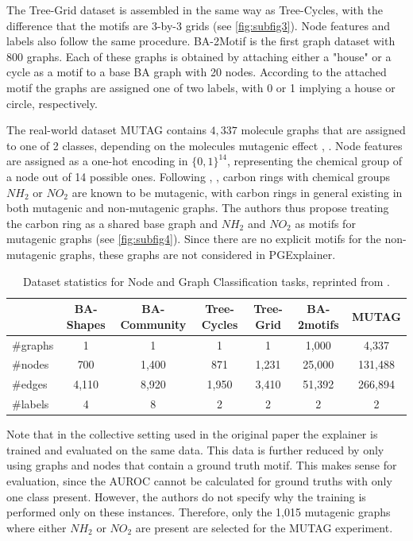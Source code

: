 The Tree-Grid dataset is assembled in the same way as Tree-Cycles, with the difference that the motifs are 3-by-3 grids (see \ref{fig:subfig3}). Node features and labels also follow the same procedure.
BA-2Motif is the first graph dataset with 800 graphs. Each of these graphs is obtained by attaching either a "house" or a cycle as a motif to a base BA graph with 20 nodes. According to the attached motif the graphs are assigned one of two labels, with 0 or 1 implying a house or circle, respectively.

The real-world dataset MUTAG contains $4,337$ molecule graphs that are assigned to one of 2 classes, depending on the molecules mutagenic effect \cite{riesen2008iam}, \cite{ying2019gnnexplainer}. Node features are assigned as a one-hot encoding in $\{0,1\}^{14}$, representing the chemical group of a node out of 14 possible ones. Following \cite{debnath1991structure}, \cite{ying2019gnnexplainer}, carbon rings with chemical groups $NH_2$ or $NO_2$ are known to be mutagenic, with carbon rings in general existing in both mutagenic and non-mutagenic graphs. The authors thus propose treating the carbon ring as a shared base graph and $NH_2$ and $NO_2$ as motifs for mutagenic graphs (see \ref{fig:subfig4}). Since there are no explicit motifs for the non-mutagenic graphs, these graphs are not considered in PGExplainer.

\begin{table}[h]
    \centering
    \scriptsize
    \begin{tabular}{l|cccc|cc}
    \hline
    \textbf{} & \textbf{BA-Shapes} & \textbf{BA-Community} & \textbf{Tree-Cycles} & \textbf{Tree-Grid} & \textbf{BA-2motifs} & \textbf{MUTAG} \\
    \hline
    \#graphs & 1 & 1 & 1 & 1 & 1,000 & 4,337 \\
    \#nodes  & 700 & 1,400 & 871 & 1,231 & 25,000 & 131,488 \\
    \#edges  & 4,110 & 8,920 & 1,950 & 3,410 & 51,392 & 266,894 \\
    \#labels & 4 & 8 & 2 & 2 & 2 & 2 \\
    \hline
    \end{tabular}
    \caption[Statistics of PGExplainer datasets]{Dataset statistics for Node and Graph Classification tasks, reprinted from \cite{luo2020parameterized}.}
    \label{tab:dataset-statistics}
\end{table}

Note that in the collective setting used in the original paper the explainer is trained and evaluated on the same data. This data is further reduced by only using graphs and nodes that contain a ground truth motif. This makes sense for evaluation, since the AUROC cannot be calculated for ground truths with only one class present. However, the authors do not specify why the training is performed only on these instances. Therefore, only the 1,015 mutagenic graphs where either $NH_2$ or $NO_2$ are present are selected for the MUTAG experiment. \bigskip

